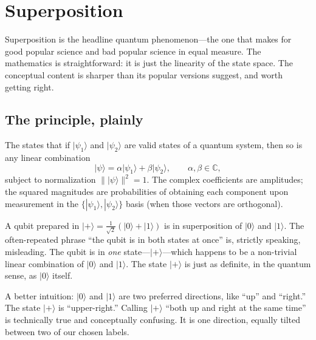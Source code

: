\chapter{Superposition}


Superposition is the headline quantum phenomenon---the one that makes for good popular science and bad popular science in equal measure. The mathematics is straightforward: it is just the linearity of the state space. The conceptual content is sharper than its popular versions suggest, and worth getting right.

\section{The principle, plainly}

The  states that if $|\psi_1\rangle$ and $|\psi_2\rangle$ are valid states of a quantum system, then so is any linear combination
\[
  |\psi\rangle = \alpha|\psi_1\rangle + \beta|\psi_2\rangle, \qquad \alpha,\beta\in\mathbb{C},
\]
subject to normalization $\||\psi\rangle\|^2 = 1$. The complex coefficients are amplitudes; the squared magnitudes are probabilities of obtaining each component upon measurement in the $\{|\psi_1\rangle,|\psi_2\rangle\}$ basis (when those vectors are orthogonal).

A qubit prepared in $|+\rangle = \tfrac{1}{\sqrt 2}(|0\rangle + |1\rangle)$ is in superposition of $|0\rangle$ and $|1\rangle$. The often-repeated phrase ``the qubit is in both states at once'' is, strictly speaking, misleading. The qubit is in \emph{one} state---$|+\rangle$---which happens to be a non-trivial linear combination of $|0\rangle$ and $|1\rangle$. The state $|+\rangle$ is just as definite, in the quantum sense, as $|0\rangle$ itself.

\begin{remark}
A better intuition: $|0\rangle$ and $|1\rangle$ are two preferred directions, like ``up'' and ``right.'' The state $|+\rangle$ is ``upper-right.'' Calling $|+\rangle$ ``both up and right at the same time'' is technically true and conceptually confusing. It is one direction, equally tilted between two of our chosen labels.
\end{remark}

